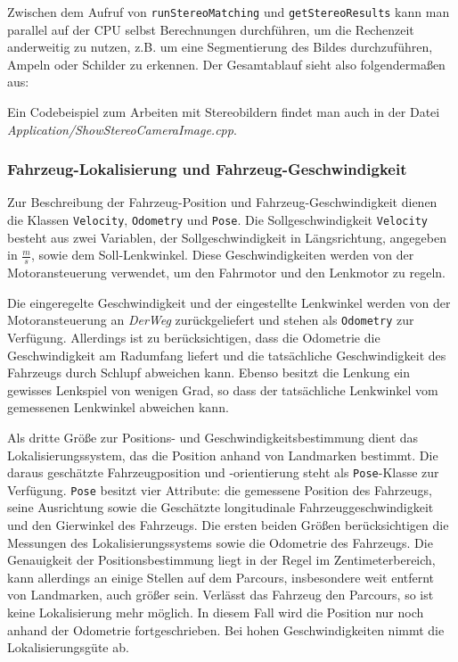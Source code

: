 \documentclass[a4paper, 11pt]{article}
\newcommand{\code}[1]{\texttt{#1}}
\newcommand{\codeex}[2][0.98\textwidth]{\vspace*{1ex}\noindent\fbox{\parbox{#1}{}}\vspace*{1ex}}
\newcommand{\DerWeg}{\textit{DerWeg }}  %
\begin{document}
{Zwischen dem Aufruf von \texttt{runStereoMatching} und \texttt{getStereoResults} kann man parallel auf der CPU selbst Berechnungen durchführen, um die Rechenzeit anderweitig zu nutzen, z.B. um eine Segmentierung des Bildes durchzuführen, Ampeln oder Schilder zu erkennen. Der Gesamtablauf sieht also folgendermaßen aus:
  
\codeex[0.9\textwidth]{beispielStereo.cpp}

Ein Codebeispiel zum Arbeiten mit Stereobildern findet man auch in der Datei \textit{Application/ShowStereoCameraImage.cpp}.

\subsubsection{Fahrzeug-Lokalisierung und Fahrzeug-Geschwindigkeit}

Zur Beschreibung der Fahrzeug-Position und Fahrzeug-Geschwindigkeit dienen die Klassen \code{Velocity}, \code{Odometry} und \code{Pose}. Die Sollgeschwindigkeit \code{Velocity} besteht aus zwei Variablen, der Sollgeschwindigkeit in Längsrichtung, angegeben in $\frac{m}{s}$, sowie dem Soll-Lenkwinkel. Diese Geschwindigkeiten werden von der Motoransteuerung verwendet, um den Fahrmotor und den Lenkmotor zu regeln.

Die eingeregelte Geschwindigkeit und der eingestellte Lenkwinkel werden von der Motoransteuerung an \DerWeg zurückgeliefert und stehen als \code{Odometry} zur Verfügung. Allerdings ist zu berücksichtigen, dass die Odometrie die Geschwindigkeit am Radumfang liefert und die tatsächliche Geschwindigkeit des Fahrzeugs durch Schlupf abweichen kann. Ebenso besitzt die Lenkung ein gewisses Lenkspiel von wenigen Grad, so dass der tatsächliche Lenkwinkel vom gemessenen Lenkwinkel abweichen kann.

Als dritte Größe zur Positions- und Geschwindigkeitsbestimmung dient das Lokalisierungssystem, das die Position anhand von Landmarken bestimmt. Die daraus geschätzte Fahrzeugposition und -orientierung steht als \code{Pose}-Klasse zur Verfügung. \code{Pose} besitzt vier Attribute: die gemessene Position des Fahrzeugs, seine Ausrichtung sowie die Geschätzte longitudinale Fahrzeuggeschwindigkeit und den Gierwinkel des Fahrzeugs. Die ersten beiden Größen berücksichtigen die Messungen des Lokalisierungssystems sowie die Odometrie des Fahrzeugs. Die Genauigkeit der Positionsbestimmung liegt in der Regel im Zentimeterbereich, kann allerdings an einige Stellen auf dem Parcours, insbesondere weit entfernt von Landmarken, auch größer sein. Verlässt das Fahrzeug den Parcours, so ist keine Lokalisierung mehr möglich. In diesem Fall wird die Position nur noch anhand der Odometrie fortgeschrieben. Bei hohen Geschwindigkeiten nimmt die Lokalisierungsgüte ab.

}
\end{document}
